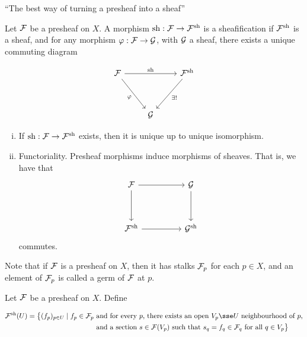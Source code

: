 \documentclass{article}
\begin{document}
``The best way of turning a presheaf into a sheaf''

\begin{definition}
    [sheafification] Let \(\mathcal{F}\) be a presheaf on \(X\). A morphism \(\operatorname{sh} : \mathcal{F} \to \mathcal{F}^{\operatorname{sh}}\) is a sheafification if \(\mathcal{F}^{\operatorname{sh}}\) is a sheaf, and for any morphism \(\varphi : \mathcal{F} \to \mathcal{G}\), with \(\mathcal{G}\) a sheaf, there exists a unique commuting diagram

\[\begin{tikzcd}
	\mcF && {\mcF^{\sh}} \\
	\\
	& \mcG
	\arrow["\varphi"', from=1-1, to=3-2]
	\arrow["\sh", from=1-1, to=1-3]
	\arrow["{\exists!}", from=1-3, to=3-2]
\end{tikzcd}\]
\end{definition}

\begin{remark}
    \begin{enumerate}[(i)]
        \item If \(\operatorname{sh} : \mathcal{F} \to \mathcal{F}^{\operatorname{sh}}\) exists, then it is unique up to unique isomorphism.
        \item Functoriality. Presheaf morphisms induce morphisms of sheaves. That is, we have that
        \[\begin{tikzcd}
            \mcF && \mcG \\
            \\
            {\mcF^{\sh}} && {\mcG^{\sh}}
            \arrow[from=1-1, to=3-1]
            \arrow[from=1-1, to=1-3]
            \arrow[from=1-3, to=3-3]
            \arrow[from=3-1, to=3-3]
        \end{tikzcd}\]
        commutes.
    \end{enumerate}
\end{remark}

Note that if \(\mathcal{F}\) is a presheaf on \(X\), then it has stalks \(\mathcal{F}_p\) for each \(p \in X\), and an element of \(\mathcal{F}_p\) is called a germ of \(\mathcal{F}\) at \(p\).

\begin{proposition}
    Let \(\mathcal{F}\) be a presheaf on \(X\). Define

    \begin{align*}
        \mcF^{\sh}(U) = \big\{(f_p)_{p \in U} \mid f_p \in \mcF_p &\text{ and for every }p\text{, there exists an open }V_p \sse U\text{ neighbourhood of }p, \\ &\text{ and a section }s \in \mcF(V_p)\text{ such that }s_q = f_q \in \mcF_q\text{ for all }q \in V_p\big\}
    \end{align*}
\end{proposition}
\end{document}
